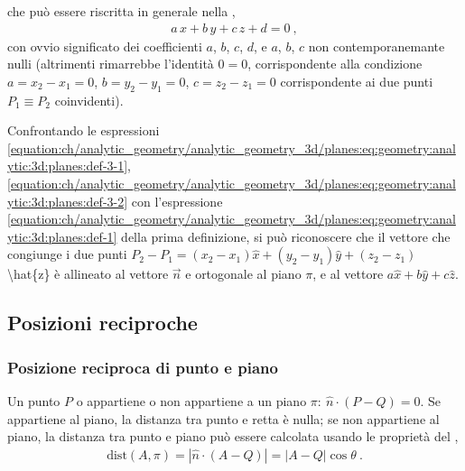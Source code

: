 \documentclass[letterpaper,10pt,english]{jupyterBook}
\begin{document}
\sphinxAtStartPar
che può essere riscritta in generale nella ,
\begin{equation}\label{equation:ch/analytic_geometry/analytic_geometry_3d/planes:eq:geometry:analytic:3d:planes:def-3-2}
\begin{split}a \, x + b \, y + c \, z + d = 0 \ ,\end{split}
\end{equation}
\sphinxAtStartPar
con ovvio significato dei coefficienti \(a\), \(b\), \(c\), \(d\), e \(a\), \(b\), \(c\) non contemporanemante nulli (altrimenti rimarrebbe l’identità \(0 = 0\), corrispondente alla condizione \(a = x_2 - x_1 = 0\), \(b = y_2 - y_1 = 0\), \(c = z_2 - z_1 = 0\) corrispondente ai due punti \(P_1 \equiv P_2\) coinvidenti).

\sphinxAtStartPar
{} Confrontando le espressioni \eqref{equation:ch/analytic_geometry/analytic_geometry_3d/planes:eq:geometry:analytic:3d:planes:def-3-1}, \eqref{equation:ch/analytic_geometry/analytic_geometry_3d/planes:eq:geometry:analytic:3d:planes:def-3-2} con l’espressione \eqref{equation:ch/analytic_geometry/analytic_geometry_3d/planes:eq:geometry:analytic:3d:planes:def-1} della prima definizione, si può riconoscere che il vettore che congiunge i due punti \(P_2 - P_1 = (x_2 - x_1) \hat{x} + (y_2 - y_1) \hat{y} + (z_2 - z_1)\) \textbackslash{}hat\{z\} è allineato al vettore \(\vec{n}\) e ortogonale al piano \(\pi\), e al vettore \(a \hat{x} + b \hat{y} + c \hat{z}\).


\subsection{Posizioni reciproche}
\label{\detokenize{ch/analytic_geometry/analytic_geometry_3d/planes:posizioni-reciproche}}

\subsubsection{Posizione reciproca di punto e piano}
\label{\detokenize{ch/analytic_geometry/analytic_geometry_3d/planes:posizione-reciproca-di-punto-e-piano}}
\sphinxAtStartPar
Un punto \(P\) o appartiene o non appartiene a un piano \(\pi: \ \hat{n} \cdot (P - Q) = 0\). Se appartiene al piano, la distanza tra punto e retta è nulla; se non appartiene al piano, la distanza tra punto e piano può essere calcolata usando le proprietà
del {\hyperref[\detokenize{ch/algebra/vector-algebra-euclidean-space:math-hs-algebra-vector-euclidean-space-inner-product}]{}},
\begin{equation*}
\begin{split}\text{dist}(A,\pi) = \left| \hat{n} \cdot (A-Q) \right| = |A-Q| \cos \theta \ .\end{split}
\end{equation*}
\sphinxAtStartPar
{} 
\end{document}
